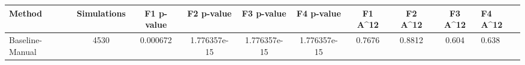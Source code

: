 \begin{tabular}{lcccccccc}
\toprule
         Method &  Simulations &  F1 p-value &   F2 p-value &   F3 p-value &   F4 p-value &  F1 A^12 &  F2 A^12 &  F3 A^12 &  F4 A^12 \\
\midrule
Baseline-Manual &         4530 &    0.000672 & 1.776357e-15 & 1.776357e-15 & 1.776357e-15 &   0.7676 &   0.8812 &    0.604 &    0.638 \\
\bottomrule
\end{tabular}
